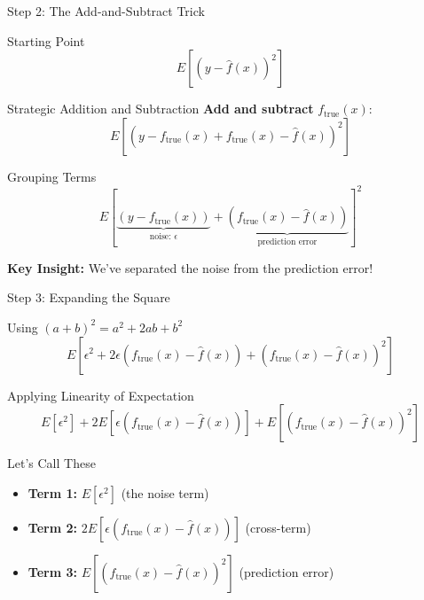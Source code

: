 \documentclass[10pt]{beamer}
\begin{document}
\begin{frame}{Step 2: The Add-and-Subtract Trick}
\begin{keypointsbox}{Starting Point}
$$E[(y - \hat{f}(x))^2]$$
\end{keypointsbox}

\begin{examplebox}{Strategic Addition and Subtraction}
\textbf{Add and subtract } $f_{\text{true}}(x)$:
$$E[(y - f_{\text{true}}(x) + f_{\text{true}}(x) - \hat{f}(x))^2]$$
\end{examplebox}

\begin{definitionbox}{Grouping Terms}
$$E[\underbrace{(y - f_{\text{true}}(x))}_{\text{noise: } \epsilon} + \underbrace{(f_{\text{true}}(x) - \hat{f}(x))}_{\text{prediction error}}]^2$$
\end{definitionbox}

\begin{alertbox}
\textbf{Key Insight:} We've separated the noise from the prediction error!
\end{alertbox}
\end{frame}

\begin{frame}{Step 3: Expanding the Square}
\begin{keypointsbox}{Using $(a + b)^2 = a^2 + 2ab + b^2$}
$$E[\epsilon^2 + 2\epsilon(f_{\text{true}}(x) - \hat{f}(x)) + (f_{\text{true}}(x) - \hat{f}(x))^2]$$
\end{keypointsbox}

\begin{examplebox}{Applying Linearity of Expectation}
$$E[\epsilon^2] + 2E[\epsilon(f_{\text{true}}(x) - \hat{f}(x))] + E[(f_{\text{true}}(x) - \hat{f}(x))^2]$$
\end{examplebox}

\begin{definitionbox}{Let's Call These}
\begin{itemize}
\item \textbf{Term 1:} $E[\epsilon^2]$ (the noise term)
\item \textbf{Term 2:} $2E[\epsilon(f_{\text{true}}(x) - \hat{f}(x))]$ (cross-term)
\item \textbf{Term 3:} $E[(f_{\text{true}}(x) - \hat{f}(x))^2]$ (prediction error)
\end{itemize}
\end{definitionbox}
\end{frame}
\end{document}
